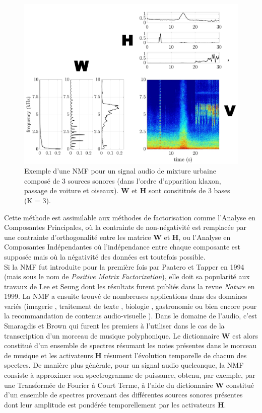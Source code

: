 \begin{figure}[htb]
\centering
\includegraphics[width=.5\textwidth]{images/NMF/schema_introduction_nmf.pdf}
\caption{Exemple d'une NMF pour un signal audio de mixture urbaine composé de 3 sources sonores (dans l'ordre d'apparition klaxon, passage de voiture et oiseaux). $\mathbf{W}$ et $\mathbf{H}$ sont consititués de 3 bases (K = 3).}
\label{fig:ex_NMF}
\end{figure}


Cette méthode est assimilable aux méthodes de factorisation comme l'Analyse en Composantes Principales, où la contrainte de non-négativité est remplacée par une contrainte d'orthogonalité entre les matrice $\mathbf{W}$ et $\mathbf{H}$, ou l'Analyse en Composantes Indépendantes où l'indépendance entre chaque composante est supposée mais où la négativité des données est toutefois possible. \\


Si la NMF fut introduite pour la première fois par Paatero et Tapper \cite{paatero_positive_1994} en 1994 (mais sous le nom de \textit{Positive Matrix Factorization}), elle doit sa popularité aux travaux de Lee et Seung \cite{lee_learning_1999} dont les résultats furent publiés dans la revue \textit{Nature} en 1999. La NMF a ensuite trouvé de nombreuses applications dans des domaines variés 
(imagerie \cite{guillamet_introducing_2003} \cite{monga_robust_2007}, traitement de texte \cite{xu_document_2003} \cite{berry_email_2005}, biologie \cite{gao_improving_2005} \cite{chen_constrained_nodate}, gastronomie \cite{hawkins_clustering_2006} ou bien encore pour la recommandation de contenus audio-visuelle \cite{luo2014efficient}). Dans le domaine de l'audio, c'est Smaragdis et Brown \cite{smaragdis_non-negative_2003} qui furent les premiers à l'utiliser dans le cas de la transcription d'un morceau de musique polyphonique. Le dictionnaire $\mathbf{W}$ est alors constitué d'un ensemble de spectres résumant les notes présentes dans le morceau de musique et les activateurs $\mathbf{H}$ résument l'évolution temporelle de chacun des spectres. De manière plus générale, pour un signal audio quelconque, la NMF consiste à approximer son spectrogramme de puissance, obtenu, par exemple, par une Transformée de Fourier à Court Terme, à l'aide du dictionnaire $\textbf{W}$ constitué d'un ensemble de spectres provenant des différentes sources sonores présentes dont leur amplitude est pondérée temporellement par les activateurs $\textbf{H}$. 

